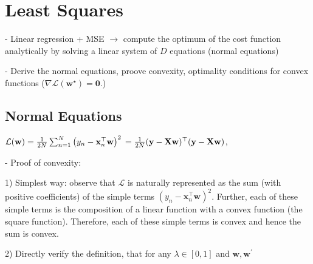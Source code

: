 
\section*{Least Squares}
- Linear regression + MSE $\rightarrow$ compute the optimum of the cost function analytically by solving a linear system of $D$ equations (normal equations)

- Derive the normal equations, proove convexity, optimality conditions for convex functions ($
\nabla \mathcal{L}\left(\mathbf{w}^{\star}\right)=\mathbf{0} .
$)

\subsection*{Normal Equations}
$\mathcal{L}(\mathbf{w})=\frac{1}{2 N} \sum_{n=1}^{N}\left(y_{n}-\mathbf{x}_{n}^{\top} \mathbf{w}\right)^{2}\\=\frac{1}{2 N}(\mathbf{y}-\mathbf{X} \mathbf{w})^{\top}(\mathbf{y}-\mathbf{X} \mathbf{w})$,



- Proof of convexity:

1) Simplest way: observe that $\mathcal{L}$ is naturally represented as the sum (with positive coefficients) of the simple terms $\left(y_{n}-\mathbf{x}_{n}^{\top} \mathbf{w}\right)^{2}$. Further, each of these simple terms is the composition of a linear function with a convex function (the square function). Therefore, each of these simple terms is convex and hence the sum is convex.

2) Directly verify the definition, that for any $\lambda \in[0,1]$ and $\mathbf{w}, \mathbf{w}^{\prime}$


